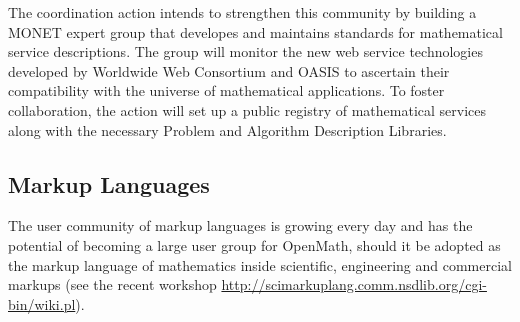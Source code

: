 \documentclass[draft]{artikel3}
\begin{document}
The coordination action intends to strengthen this community by
building a MONET expert group that developes and maintains standards
for mathematical service descriptions. The group will monitor the new
web service technologies developed by Worldwide Web Consortium and
OASIS to ascertain their compatibility with the universe of
mathematical applications. To foster collaboration, the action will
set up a public registry of mathematical services along with the
necessary Problem and Algorithm Description Libraries.










\subsection{Markup Languages}
\label{sec:ml}

The user community of markup languages is growing every day and has
the potential of becoming a large user group for OpenMath, should it
be adopted as the markup language of mathematics inside scientific,
engineering and commercial markups (see the recent workshop
\url{http://scimarkuplang.comm.nsdlib.org/cgi-bin/wiki.pl}).
\end{document}
